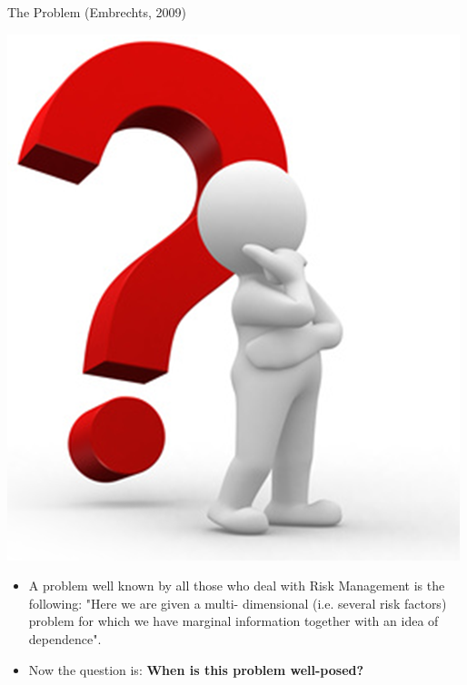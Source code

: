 \documentclass[11pt]{beamer}
\theoremstyle{plain}
\theoremstyle{definition}
\theoremstyle{remark}
\begin{document}
\begin{frame}{The Problem (Embrechts, 2009)}
	\noindent\begin{minipage}{0.5\textwidth}%
	\includegraphics[width=\linewidth]{fig/omino_interrogativo.png}
	\end{minipage}%
	\hfill%
	\begin{minipage}{0.5\textwidth}
	   \begin{itemize}
	      \item A problem well known by all those who deal with Risk Management is the following: "Here we are given a multi-
	      dimensional (i.e. 
	      several risk factors) problem for which we have marginal information together with an idea of dependence". 
		  \item Now the question is: \textbf{When is this problem well-posed?}
	   \end{itemize}
	\end{minipage}
\end{frame}
%
\end{document}
